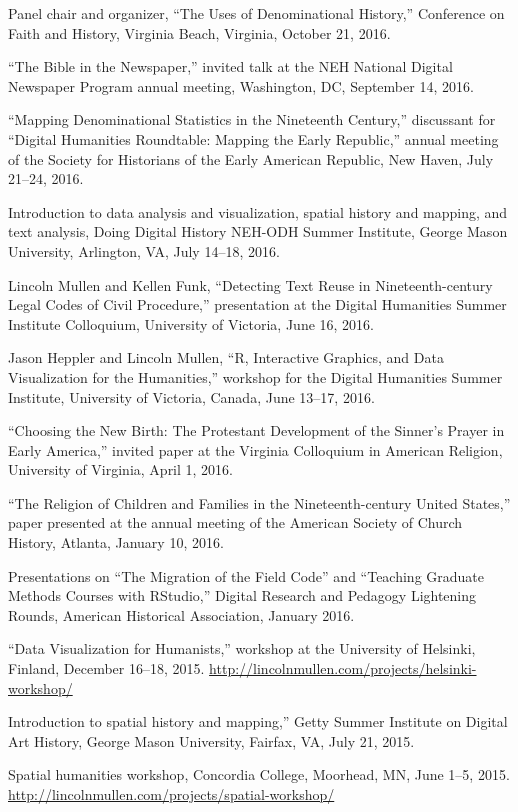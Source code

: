 \documentclass[11pt]{article}
\begin{document}
Panel chair and organizer, ``The Uses of Denominational History,'' Conference 
on Faith and History, Virginia Beach, Virginia, October 21, 2016.

``The Bible in the Newspaper,'' invited talk at the NEH National Digital 
Newspaper Program annual meeting, Washington, DC, September 14, 2016.

``Mapping Denominational Statistics in the Nineteenth Century,'' discussant 
for ``Digital Humanities Roundtable: Mapping the Early Republic,'' annual 
meeting of the Society for Historians of the Early American Republic, New 
Haven, July 21--24, 2016.

Introduction to data analysis and visualization, spatial history and mapping, 
and text analysis, Doing Digital History NEH-ODH Summer Institute, George 
Mason University, Arlington, VA, July 14--18, 2016.

Lincoln Mullen and Kellen Funk, ``Detecting Text Reuse in Nineteenth-century 
Legal Codes of Civil Procedure,'' presentation at the Digital Humanities 
Summer Institute Colloquium, University of Victoria, June 16, 2016.

Jason Heppler and Lincoln Mullen, ``R, Interactive Graphics, and Data 
Visualization for the Humanities,'' workshop for the Digital Humanities Summer 
Institute, University of Victoria, Canada, June 13--17, 2016.  

``Choosing the New Birth: The Protestant Development of the Sinner's Prayer in 
Early America,'' invited paper at the Virginia Colloquium in American 
Religion, University of Virginia, April 1, 2016.

``The Religion of Children and Families in the Nineteenth-century United 
States,'' paper presented at the annual meeting of the American Society of 
Church History, Atlanta, January 10, 2016.

Presentations on ``The Migration of the Field Code'' and ``Teaching 
Graduate Methods Courses with RStudio,'' Digital Research and Pedagogy 
Lightening Rounds, American Historical Association, January 2016.

``Data Visualization for Humanists,'' workshop at the University of Helsinki, 
Finland, December 16--18, 2015. 
\url{http://lincolnmullen.com/projects/helsinki-workshop/}

Introduction to spatial history and mapping,'' Getty Summer Institute on 
Digital Art History, George Mason University, Fairfax, VA, July 21, 2015.

Spatial humanities workshop, Concordia College, Moorhead, MN, June 1--5, 2015.  
\url{http://lincolnmullen.com/projects/spatial-workshop/}
\end{document}
